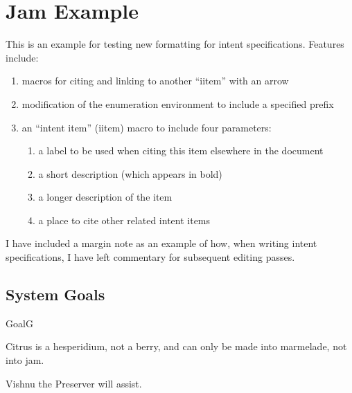 \documentclass[12pt]{article}
\begin{document}
\section{Jam Example}

This is an example for testing new formatting for intent specifications.
Features include:

\begin{enumerate}
\item macros for citing and linking to another ``iitem'' with an arrow
\item modification of the enumeration environment to include a specified prefix
\item an ``intent item'' (iitem) macro to include four parameters:
  \begin {enumerate}
  \item a label to be used when citing this item elsewhere in the document
  \item a short description (which appears in bold)
  \item a longer description of the item
    \item a place to cite other related intent items
  \end{enumerate}
\end{enumerate}

I have included a margin note as an example of how, when writing intent specifications, I have left commentary for subsequent editing passes.

\subsection{System Goals}
\begin{intent}{Goal}{G}
  \begin{enumerate}
    \end{enumerate}
  \begin{assumption}Citrus is a hesperidium, not a berry, and can only be made into marmelade, not into jam.\end{assumption}
  \begin{assumption}Vishnu the Preserver will assist.\end{assumption}
\end{intent}
\end{document}
